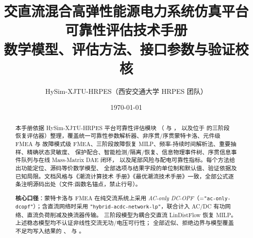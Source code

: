 \documentclass[UTF8,fontset=fandol,a4paper,12pt]{ctexart}
\title{\textbf{交直流混合高弹性能源电力系统仿真平台}\\[0.5em]
       {\Large 可靠性评估技术手册}\\[0.3em]
       {\large 数学模型、评估方法、接口参数与验证校核}}
\author{HySim-XJTU-HRPES（西安交通大学 HRPES 团队）}
\date{\today}
\begin{document}
\maketitle
\begin{abstract}
\noindent 本手册依据 HySim-XJTU-HRPES 平台可靠性评估模块
（ 与 ，
以及位于  的三阶段
恢复评估器）整理，覆盖统一可靠性参数解析器、非序贯/序贯蒙特卡洛、元件级 FMEA 与
故障模式级 FMEA、三阶段故障恢复 MILP、频率-持续时间解析法、重要抽样、精确状态灵敏度、
保护配合、智能检测/隔离/恢复、信息物理事件树、序贯信息事件队列与在线 Mass-Matrix DAE 闭环，
以及尾部风险与配电可靠性指标。每个方法给出功能定位、源码等价数学模型、
全部选项与结果字段的单位制和默认值、验证依据及已知局限。文档风格与《潮流计算技术
手册》《最优潮流技术手册》一致，全部公式逐条注明源码出处（文件:函数名锚点，禁止行号）。

\smallskip
\noindent\textbf{核心口径}：蒙特卡洛与 FMEA 在纯交流系统上采用
\emph{AC-only DC-OPF}（=\texttt{"ac-only-dcopf"}）；含直流网络时采用
\texttt{"hybrid-acdc-network-lp"}，联合计入 AC/DC 有功网络、直流负荷削减及换流器传输。
三阶段模型为耦合交直流 LinDistFlow 恢复 MILP。上述稳态模型均不认证非线性交流无功/电压可行性；
全部近似、拒绝边界与模型覆盖不足均写入结果的 、
 与 。
\end{abstract}

\tableofcontents
\newpage


























\end{document}
